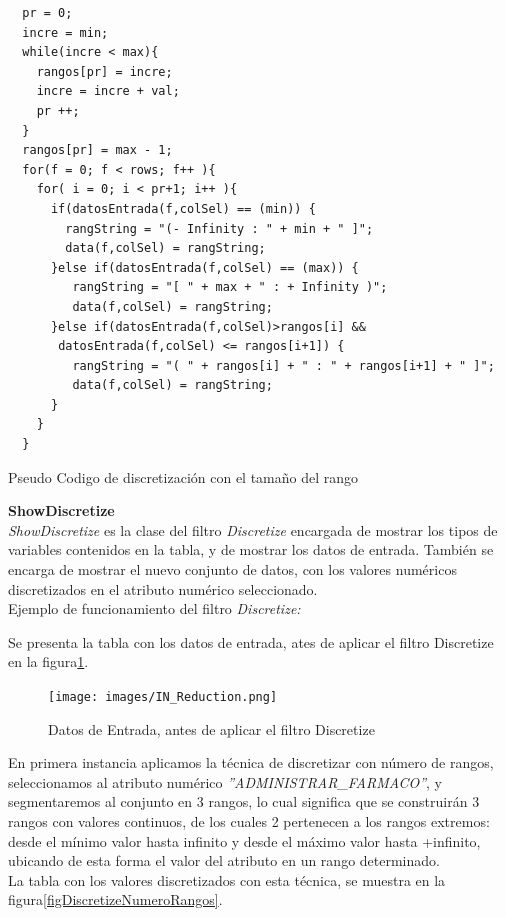 \begin{codigof}[!h]
\begin{verbatim} 
  pr = 0;
  incre = min;
  while(incre < max){
    rangos[pr] = incre;
    incre = incre + val;
    pr ++;
  }
  rangos[pr] = max - 1;        
  for(f = 0; f < rows; f++ ){ 
    for( i = 0; i < pr+1; i++ ){
      if(datosEntrada(f,colSel) == (min)) {
        rangString = "(- Infinity : " + min + " ]"; 
        data(f,colSel) = rangString;
      }else if(datosEntrada(f,colSel) == (max)) {
         rangString = "[ " + max + " : + Infinity )"; 
         data(f,colSel) = rangString;
      }else if(datosEntrada(f,colSel)>rangos[i] && 
       datosEntrada(f,colSel) <= rangos[i+1]) { 
         rangString = "( " + rangos[i] + " : " + rangos[i+1] + " ]"; 
         data(f,colSel) = rangString;
      }
    }
  } 
\end{verbatim}
\caption{Pseudo Codigo de discretizaci\'on con el tama\~no del rango}
\label{codDconTRangos}
\end{codigof}	         


\textbf{ShowDiscretize} \\ 
\textit{ShowDiscretize} es la clase del filtro \textit{Discretize} encargada de mostrar los tipos de variables contenidos en la tabla, y de mostrar los datos de entrada. Tambi\'en se encarga de mostrar el nuevo conjunto de datos, con los valores num\'ericos discretizados en el atributo num\'erico seleccionado. \\
Ejemplo de funcionamiento del filtro \textit{Discretize:}

Se presenta la tabla con los datos de entrada, ates de aplicar el filtro Discretize en la figura\ref{INDiscretize}. \\

\begin{figure}[h]
\centering
\texttt{[image: images/IN\_Reduction.png]}
\caption{Datos de Entrada, antes de aplicar el filtro Discretize}
\label{INDiscretize}
\end{figure}  

En primera instancia aplicamos la t\'ecnica de discretizar con n\'umero de rangos, seleccionamos al atributo num\'erico \textit{''ADMINISTRAR\_FARMACO''}, y segmentaremos al conjunto en 3 rangos, lo cual significa que se construir\'an 3 rangos con valores continuos, de los cuales 2 pertenecen a los rangos extremos: desde el m\'inimo valor hasta \-infinito y desde el m\'aximo valor hasta +infinito, ubicando de esta forma el valor del atributo en un rango determinado.\\ 
La tabla con los valores discretizados con esta t\'ecnica, se muestra en la figura\ref{figDiscretizeNumeroRangos}. \\

